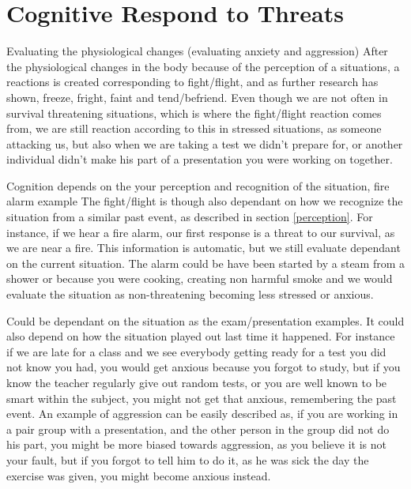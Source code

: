 \section{Cognitive Respond to Threats}

Evaluating the physiological changes (evaluating anxiety and aggression)
After the physiological changes in the body because of the perception of a situations, a reactions is created corresponding to fight/flight, and as further research has shown, freeze, fright, faint and tend/befriend. Even though we are not often in survival threatening situations, which is where the fight/flight reaction comes from, we are still reaction according to this in stressed situations, as someone attacking us, but also when we are taking a test we didn't prepare for, or another individual didn't make his part of a presentation you were working on together.

Cognition depends on the your perception and recognition of the situation, fire alarm example
The fight/flight is though also dependant on how we recognize the situation from a similar past event, as described in section \ref{perception}. For instance, if we hear a fire alarm, our first response is a threat to our survival, as we are near a fire. This information is automatic, but we still evaluate dependant on the current situation. The alarm could be have been started by a steam from a shower or because you were cooking, creating non harmful smoke and we would evaluate the situation as non-threatening becoming less stressed or anxious.

Could be dependant on the situation as the exam/presentation examples.
It could also depend on how the situation played out last time it happened. For instance if we are late for a class and we see everybody getting ready for a test you did not know you had, you would get anxious because you forgot to study, but if you know the teacher regularly give out random tests, or you are well known to be smart within the subject, you might not get that anxious, remembering the past event.
An example of aggression can be easily described as, if you are working in a pair group with a presentation, and the other person in the group did not do his part, you might be more biased towards aggression, as you believe it is not your fault, but if you forgot to tell him to do it, as he was sick the day the exercise was given, you might become anxious instead. %

